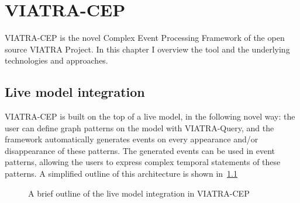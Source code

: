 \chapter{VIATRA-CEP}
\label{chap:viatra_cep}
VIATRA-CEP\citep{CEP}\citep{davidi} is the novel Complex Event Processing Framework of the open source VIATRA Project.
In this chapter I overview the tool and the underlying technologies and approaches.

\section{Live model integration}
VIATRA-CEP is built on the top of a live model, in the following novel way:
the user can define graph patterns on the model with VIATRA-Query, and the framework
automatically generates events on every appearance and/or disappearance of these patterns.
The generated events can be used in event patterns, allowing the users to express complex
temporal statements of these patterns. A simplified outline of this architecture is shown in~\cref{fig:viatracep:oldinputs}



\begin{figure}[h]
\noindent
{}
	\caption{A brief outline of the live model integration in VIATRA-CEP}
	\label{fig:viatracep:oldinputs}
\end{figure}


